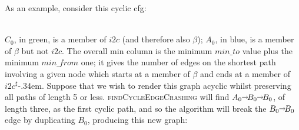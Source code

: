 \noindent
As an example, consider this cyclic \gls{cfg}:\\
\centerline{
}\\
\noindent $C_0$, in green, is a member of $i2c$ (and therefore also
$\beta$); $A_0$, in blue, is a member of $\beta$ but not $i2c$.  The
overall min column is the minimum $\mathit{min\_to}$ value plus the
minimum $\mathit{min\_from}$ one; it gives the number of edges on the
shortest path involving a given node which starts at a member of
$\beta$ and ends at a member of $i2c^\sharp$\kern-.34em.  Suppose that we wish to
render this graph acyclic whilst preserving all paths of length 5 or
less.  \textsc{findCycleEdgeCrashing} will find $A_0 \shortrightarrow B_0
\shortrightarrow B_0$, of length three, as the first cyclic path, and so
the algorithm will break the $B_0 \shortrightarrow B_0$ edge by
duplicating $B_0$, producing this new graph:\\
